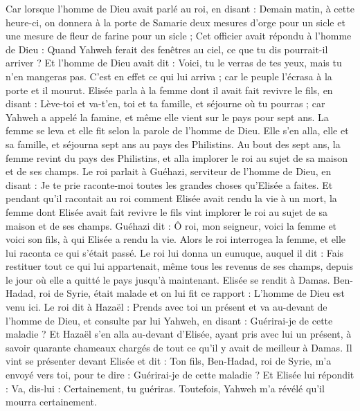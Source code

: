 \begin{multicols}{2}
Car lorsque l'homme de Dieu avait parlé au roi, en disant : Demain matin, à cette heure-ci, on donnera à la porte de Samarie deux mesures d'orge pour un sicle et une mesure de fleur de farine pour un sicle ;
Cet officier avait répondu à l'homme de Dieu : Quand Yahweh ferait des fenêtres au ciel, ce que tu dis pourrait-il arriver ? Et l'homme de Dieu avait dit : Voici, tu le verras de tes yeux, mais tu n'en mangeras pas.
C'est en effet ce qui lui arriva ; car le peuple l'écrasa à la porte et il mourut.
\VerseOne{}Elisée parla à la femme dont il avait fait revivre le fils, en disant : Lève-toi et va-t'en, toi et ta famille, et séjourne où tu pourras ; car Yahweh a appelé la famine, et même elle vient sur le pays pour sept ans.
La femme se leva et elle fit selon la parole de l'homme de Dieu. Elle s'en alla, elle et sa famille, et séjourna sept ans au pays des Philistins.
Au bout des sept ans, la femme revint du pays des Philistins, et alla implorer le roi au sujet de sa maison et de ses champs.
Le roi parlait à Guéhazi, serviteur de l'homme de Dieu, en disant : Je te prie raconte-moi toutes les grandes choses qu'Elisée a faites.
Et pendant qu'il racontait au roi comment Elisée avait rendu la vie à un mort, la femme dont Elisée avait fait revivre le fils vint implorer le roi au sujet de sa maison et de ses champs. Guéhazi dit : Ô roi, mon seigneur, voici la femme et voici son fils, à qui Elisée a rendu la vie.
Alors le roi interrogea la femme, et elle lui raconta ce qui s'était passé. Le roi lui donna un eunuque, auquel il dit : Fais restituer tout ce qui lui appartenait, même tous les revenus de ses champs, depuis le jour où elle a quitté le pays jusqu'à maintenant.
Elisée se rendit à Damas. Ben-Hadad, roi de Syrie, était malade et on lui fit ce rapport : L'homme de Dieu est venu ici.
Le roi dit à Hazaël : Prends avec toi un présent et va au-devant de l'homme de Dieu, et consulte par lui Yahweh, en disant : Guérirai-je de cette maladie ?
Et Hazaël s'en alla au-devant d'Elisée, ayant pris avec lui un présent, à savoir quarante chameaux chargés de tout ce qu'il y avait de meilleur à Damas. Il vint se présenter devant Elisée et dit : Ton fils, Ben-Hadad, roi de Syrie, m'a envoyé vers toi, pour te dire : Guérirai-je de cette maladie ?
Et Elisée lui répondit : Va, dis-lui : Certainement, tu guériras. Toutefois, Yahweh m'a révélé qu'il mourra certainement.

\end{multicols}
